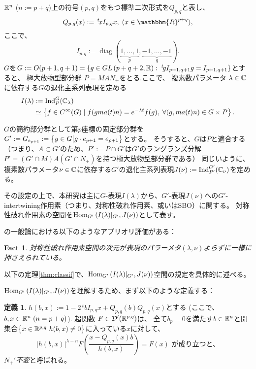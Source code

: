 \documentclass[12pt]{article} %
\newcommand{\assign}{:=}
\newcommand{\tmop}[1]{\ensuremath{\operatorname{#1}}}
\newcommand{\tmtextit}[1]{{\itshape{#1}}}
\newcommand{\Hom}{\mbox{\normalfont Hom}}
\newcommand{\Ind}{\mbox{\normalfont Ind}}
\newtheorem{fact}{Fact}
\theoremstyle{definition}
\newtheorem{definition}{定義}
\theoremstyle{exampstyle} \newtheorem{examp}[theorem]{Theorem}
\renewcommand{\Q}{Q_{p,q}}
\newcommand{\IlambdaGprime}{I(\lambda)\kern-0.3em\mid_{G'}}
\newcommand{\SBO}{\Hom_{G'}\left(\IlambdaGprime,J(\nu) \right)}
\begin{document}
  \begin{versiona}
	  $\mathbb{R}^n$ ($n:=p+q$)上の符号$(p,q)$をもつ標準二次形式を$\Q$と表し、
	  \begin{equation*}
  \Q (x) \assign \,^t \! x I_{p, q} x, \; (x \in
  \mathbbm{R}^{p + q}),
	  \end{equation*}
	  ここで、
\begin{equation*}
   I_{p, q} \assign \tmop{diag} (\underbrace{1, \ldots, 1}_p, \underbrace{-
  1, \ldots, - 1}_q).
\end{equation*}
$G$を$G \assign O (p +
1, q + 1)=\left\{ g\in GL\left( p+q+2,\R \right):\;^t\!gI_{p+1,q+1}g=I_{p+1,q+1} \right\}$とすると、
極大放物型部分群
$P=MAN_{+}$をとる.ここで、
複素数パラメータ
$\lambda\in\mathbb{C}$に依存する$G$の退化主系列表現を定める
\begin{align*}
I(\lambda)&:=\Ind_P^G(\C_\lambda)\\
&\simeq \left\{ f\in C^{\infty}(G)\mid f(gma(t)n)=e^{-\lambda t}f(g),\;\forall(g,ma(t)n)\in G\times P \right\}.
\end{align*}

$G$の簡約部分群として第$p$座標の固定部分群を$G':=G_{e_{p+1}}:=\left\{g \in G\big| g \cdot e_{p + 1} = e_{p + 1}\right\}$とする。
そうすると、$G$は$P$と適合する（つまり、$A\subset G'$のため、$P':=P\cap G'$は$G'$のラングランズ分解$P'=(G'\cap M)A(G'\cap N_+)$を持つ極大放物型部分群である）
同じいように、複素数パラメータ$\nu\in\mathbb{C}$に依存する$G'$の退化主系列表現$J(\nu):=\Ind_{P'}^{G'}(\C_{\nu})$を定める。

その設定の上で、本研究は主に$G$-表現$I(\lambda)$から、$G'$-表現$J(\nu)$への$G'$-intertwining作用素（つまり、対称性破れ作用素、或いはSBO）に関する。
対称性破れ作用素の空間を$\SBO$として表す。

\cite{kobayashi2013finite,kobayashi2014classification}の一般論における以下のようなアプリオリ評価がある：
\begin{fact}
	対称性破れ作用素空間の次元が表現のパラーメタ$(\lambda,\nu)$よらずに一様に押さえられている。
\end{fact}
以下の定理\ref{thm:classif}で、$\SBO$空間の規定を具体的に述べる。

$\SBO$を理解するため、まず以下のような定義する：
\begin{definition} \label{def1}
	$h(b,x):=1-2\,^t\!bI_{p,q}x+\Q(b)\Q(x)$とする (ここで、$b,x\in\mathbb{R}^{n}\;(n=p+q)$). 超関数
	$F \in \mathcal{D}' (\mathbb{R}^{p,q})$は、
	全て$b_p=0$を満たす$b\in\mathbb{R}^n$と開集合$\left\{x\in\mathbb{R}^{p,q}\big| h(b,x)\neq0\right\}$に入っている$x$に対して、
  \begin{equation*}
    \label{eq-Nequiv} | h(b,x) |^{\lambda - n} F \left(
    \frac{x - \Q (x) b}{h(b,x)} \right) = F (x)\mbox{ が成り立つと、}
  \end{equation*}
  \tmtextit{$N_+'$不変}と呼ばれる。
\end{definition}


\end{versiona}
\end{document}
